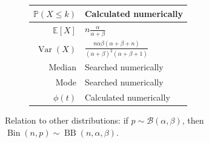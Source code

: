 \documentclass[a4paper,11pt]{article}
\theoremstyle{plain}
\theoremstyle{definition}
\newcommand{\ME}{\mathbb{E}}
\newcommand{\MP}{\mathbb{P}}
\newcommand{\Var}{\operatorname{Var}}
\begin{document}
\begin{figure}[!htb]
\begin{minipage}{0.4\textwidth}
\begin{tabular}{| r | l |}
				\hline
				$\MP(X \leq k)$ & Calculated numerically \\
				\hline
				$\ME[X]$ & $ n \frac{\alpha}{\alpha + \beta}$ \\
				\hline
				$\Var(X)$ & $\frac{n\alpha \beta (\alpha + \beta + n) }{(\alpha+\beta)^2(\alpha+\beta + 1)} $ \\
				\hline
				Median & Searched numerically \\
				\hline
				Mode & Searched numerically \\
				\hline
				$\phi(t)$ & Calculated numerically \\
				\hline
			\end{tabular}
		\end{minipage}
	\end{figure}

    Relation to other distributions: if $ p \sim \mathcal{B}(\alpha, \beta)$, then $\operatorname{Bin}(n, p) \sim \operatorname{BB}(n, \alpha, \beta)$.

	\pagebreak
\end{document}
